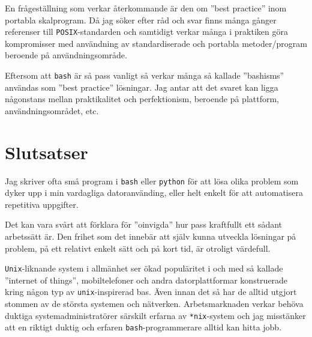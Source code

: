 En frågeställning som verkar återkommande är den om ''best practice'' inom
portabla skalprogram. Då jag söker efter råd och svar finns många gånger
referenser till \texttt{POSIX}-standarden \cite{IEEE:2001:ISRa}
\cite{IEEE:2001:ISRb} \cite{IEEE:2001:ISRc} \cite{IEEE:2001:ISRd} och samtidigt
verkar många i praktiken göra kompromisser med användning av standardiserade
och portabla metoder/program beroende på användningsområde.

Eftersom att \texttt{bash} är så pass vanligt så verkar många så kallade
''bashisms'' \cite{misc:bashism} användas som ''best practice'' lösningar. Jag
antar att det svaret kan ligga någonstans mellan praktikalitet och
perfektionism, beroende på plattform, användningsområdet, etc.





\section{Slutsatser}
Jag skriver ofta små program i \texttt{bash} eller \texttt{python} för att lösa
olika problem som dyker upp i min vardagliga datoranvänding, eller helt enkelt
för att automatisera repetitiva uppgifter. 

Det kan vara svårt att förklara för ''oinvigda'' hur pass kraftfullt ett sådant
arbetssätt är.  Den frihet som det innebär att själv kunna utveckla lösningar
på problem, på ett relativt enkelt sätt och på kort tid, är otroligt värdefull. 

\texttt{Unix}-liknande system i allmänhet ser ökad populäritet i och med så
kallade ''internet of things'', mobiltelefoner och andra datorplattformar
konstruerade kring någon typ av \texttt{unix}-inspirerad bas. Även innan det så
har de alltid utgjort stommen av de största systemen och nätverken.
Arbetsmarknaden verkar behöva duktiga systemadministratörer särskilt erfarna av
\texttt{*nix}-system och jag misstänker att en riktigt duktig och erfaren
\texttt{bash}-programmerare alltid kan hitta jobb.
